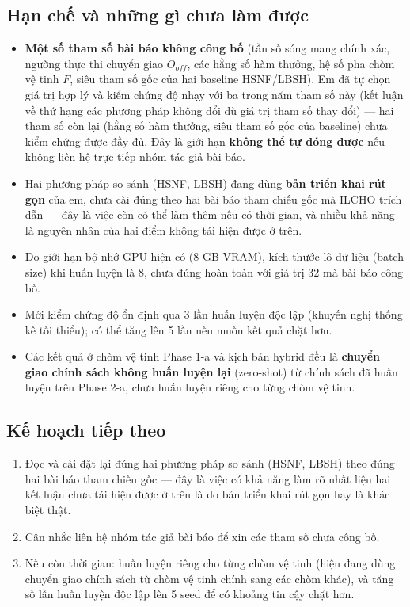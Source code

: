 \documentclass{article} %
\begin{document}
\subsection{Hạn chế và những gì chưa làm được}
\begin{itemize}
    \item \textbf{Một số tham số bài báo không công bố} (tần số sóng mang chính xác, ngưỡng thực thi chuyển giao $O_{off}$, các hằng số hàm thưởng, hệ số pha chòm vệ tinh $F$, siêu tham số gốc của hai baseline HSNF/LBSH). Em đã tự chọn giá trị hợp lý và kiểm chứng độ nhạy với ba trong năm tham số này (kết luận về thứ hạng các phương pháp không đổi dù giá trị tham số thay đổi) — hai tham số còn lại (hằng số hàm thưởng, siêu tham số gốc của baseline) chưa kiểm chứng được đầy đủ. Đây là giới hạn \textbf{không thể tự đóng được} nếu không liên hệ trực tiếp nhóm tác giả bài báo.
    \item Hai phương pháp so sánh (HSNF, LBSH) đang dùng \textbf{bản triển khai rút gọn} của em, chưa cài đúng theo hai bài báo tham chiếu gốc mà ILCHO trích dẫn — đây là việc còn có thể làm thêm nếu có thời gian, và nhiều khả năng là nguyên nhân của hai điểm không tái hiện được ở trên.
    \item Do giới hạn bộ nhớ GPU hiện có (8 GB VRAM), kích thước lô dữ liệu (batch size) khi huấn luyện là 8, chưa đúng hoàn toàn với giá trị 32 mà bài báo công bố.
    \item Mới kiểm chứng độ ổn định qua 3 lần huấn luyện độc lập (khuyến nghị thống kê tối thiểu); có thể tăng lên 5 lần nếu muốn kết quả chặt hơn.
    \item Các kết quả ở chòm vệ tinh Phase 1-a và kịch bản hybrid đều là \textbf{chuyển giao chính sách không huấn luyện lại} (zero-shot) từ chính sách đã huấn luyện trên Phase 2-a, chưa huấn luyện riêng cho từng chòm vệ tinh.
\end{itemize}

\subsection{Kế hoạch tiếp theo}
\begin{enumerate}
    \item Đọc và cài đặt lại đúng hai phương pháp so sánh (HSNF, LBSH) theo đúng hai bài báo tham chiếu gốc — đây là việc có khả năng làm rõ nhất liệu hai kết luận chưa tái hiện được ở trên là do bản triển khai rút gọn hay là khác biệt thật.
    \item Cân nhắc liên hệ nhóm tác giả bài báo để xin các tham số chưa công bố.
    \item Nếu còn thời gian: huấn luyện riêng cho từng chòm vệ tinh (hiện đang dùng chuyển giao chính sách từ chòm vệ tinh chính sang các chòm khác), và tăng số lần huấn luyện độc lập lên 5 seed để có khoảng tin cậy chặt hơn.
\end{enumerate}
\end{document}
